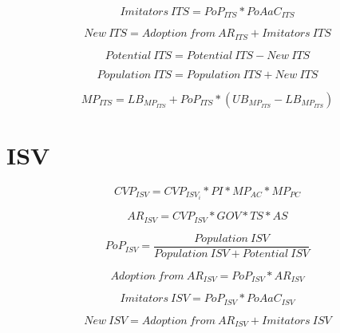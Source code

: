 \begin{equation}
	\mathit{Imitators~ITS} = PoP_{ITS} * PoAaC_{ITS}
\end{equation}

\begin{equation}
	\mathit{New~ITS} = \mathit{Adoption~from~AR_{ITS}} + \mathit{Imitators~ITS}
\end{equation}

\begin{equation}
	\mathit{Potential~ITS} = \mathit{Potential~ITS} - \mathit{New~ITS}
\end{equation}

\begin{equation}
	\mathit{Population~ITS} = \mathit{Population~ITS} + \mathit{New~ITS}
\end{equation}

\begin{equation}\label{eq:mp:its}
	MP_{ITS} = LB_{MP_{ITS}} + PoP_{ITS} * (UB_{MP_{ITS}} - LB_{MP_{ITS}})
\end{equation}

\newpage
\section{ISV}

\begin{equation}
		CVP_{ISV} =  CVP_{ISV_{i}} * PI * MP_{AC} * MP_{PC}
\end{equation}

\begin{equation}
		AR_{ISV} = CVP_{ISV} * GOV * TS * AS		
\end{equation}

\begin{equation}
	PoP_{ISV} = \frac{\mathit{Population~ISV}}{\mathit{Population~ISV}+\mathit{Potential~ISV}}
\end{equation}

\begin{equation}
	\mathit{Adoption~from~AR_{ISV}} = PoP_{ISV} * AR_{ISV}
\end{equation}

\begin{equation}
	\mathit{Imitators~ISV} = PoP_{ISV} * PoAaC_{ISV}
\end{equation}

\begin{equation}
	\mathit{New~ISV} = \mathit{Adoption~from~AR_{ISV}} + \mathit{Imitators~ISV}
\end{equation}

